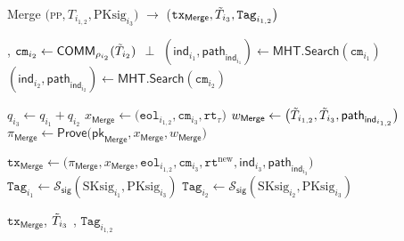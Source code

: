 \begin{algorithm}
	\caption{\textsf{Merge} $\big($\textsc{pp}$, T_{i_{1,2}},  \text{PKsig}_{i_3} \big)$ $\rightarrow$ \big($\texttt{tx}_{\textsf{Merge}}, \Tilde{T}_{i_3}, \texttt{Tag}_{i_{1,2}}\big)$}\label{alg:merge}
	\begin{algorithmic}[1]
		, {$\texttt{cm}_{i_2} \gets \mathsf{COMM}_{\rho_{i_2}}(\Tilde{T}_{i_2}) $}
		 {}
		\State \Return $\perp$
		\EndIf
		\State $(\mathsf{ind}_{i_1}, \mathsf{path}_{\mathsf{ind}_{i_1}}) \gets \mathsf{MHT}.\mathsf{Search}(\texttt{cm}_{i_1})$
		\State $(\mathsf{ind}_{i_2}, \mathsf{path}_{\mathsf{ind}_{i_2}}) \gets \mathsf{MHT}.\mathsf{Search}(\texttt{cm}_{i_2})$
		
		\State $q_{i_3} \gets q_{i_1} +  q_{i_2}$
		\State $x_\textsf{Merge} \gets \big(\texttt{eol}_{i_{1,2}}, \texttt{cm}_{i_3}, \texttt{rt}_\tau \big)$
		\State $w_\textsf{Merge} \gets \big( \Tilde{T}_{i_{1,2}}, \Tilde{T}_{i_3}, \mathsf{path}_{\mathsf{ind}_{i_{1,2}}}\big)$
		\State $\pi_{\textsf{Merge}} \gets \textsf{Prove}\big(\mathsf{pk}_{\textsf{Merge}}, x_{\textsf{Merge}}, w_{\textsf{Merge}}\big)$
		
		\State$\texttt{tx}_{\textsf{Merge}} \gets \big(\pi_{\textsf{Merge}}, x_{\textsf{Merge}}, \texttt{eol}_{i_{1,2}}, \texttt{cm}_{i_3}, \texttt{rt}^{\text{new}}, \mathsf{ind}_{i_3}, \mathsf{path}_{\mathsf{ind}_{i_3}} \big)$
		\State $\texttt{Tag}_{i_1} \leftarrow \mathcal{S}_\mathsf{sig}(\text{SKsig}_{i_1}, \text{PKsig}_{i_3})$
		\State $\texttt{Tag}_{i_2} \leftarrow \mathcal{S}_\mathsf{sig}(\text{SKsig}_{i_2}, \text{PKsig}_{i_3})$
		
		\State \Return $\texttt{tx}_{\textsf{Merge}}$, $\Tilde{T}_{i_3}$ , $\texttt{Tag}_{i_{1,2}}$
	\end{algorithmic}
\end{algorithm}

